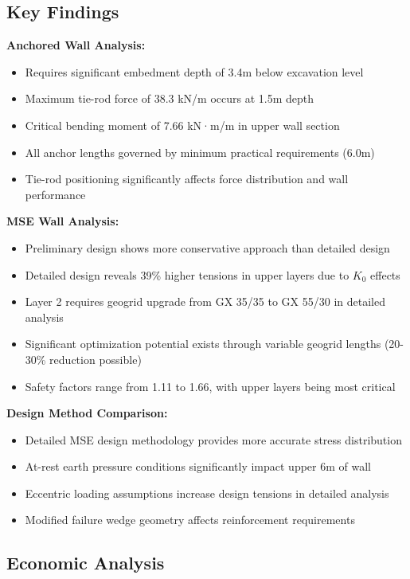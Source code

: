 \documentclass[10pt,a4paper,twocolumn]{article}
\begin{document}
\subsection{Key Findings}

\textbf{Anchored Wall Analysis:}
\begin{itemize}
\item Requires significant embedment depth of 3.4m below excavation level
\item Maximum tie-rod force of 38.3 kN/m occurs at 1.5m depth
\item Critical bending moment of 7.66 kN·m/m in upper wall section
\item All anchor lengths governed by minimum practical requirements (6.0m)
\item Tie-rod positioning significantly affects force distribution and wall performance
\end{itemize}

\textbf{MSE Wall Analysis:}
\begin{itemize}
\item Preliminary design shows more conservative approach than detailed design
\item Detailed design reveals 39\% higher tensions in upper layers due to $K_0$ effects
\item Layer 2 requires geogrid upgrade from GX 35/35 to GX 55/30 in detailed analysis
\item Significant optimization potential exists through variable geogrid lengths (20-30\% reduction possible)
\item Safety factors range from 1.11 to 1.66, with upper layers being most critical
\end{itemize}

\textbf{Design Method Comparison:}
\begin{itemize}
\item Detailed MSE design methodology provides more accurate stress distribution
\item At-rest earth pressure conditions significantly impact upper 6m of wall
\item Eccentric loading assumptions increase design tensions in detailed analysis
\item Modified failure wedge geometry affects reinforcement requirements
\end{itemize}

\subsection{Economic Analysis}
\end{document}
